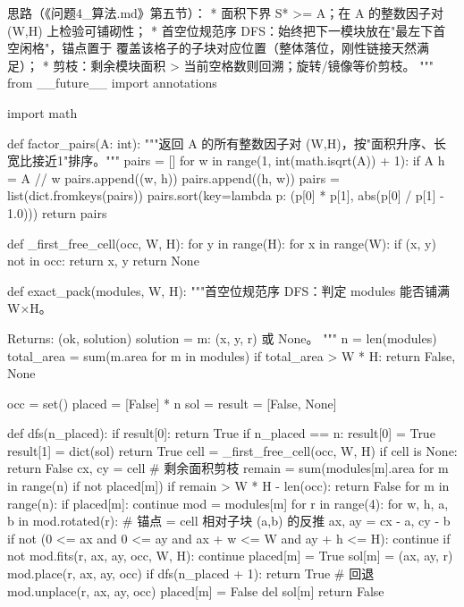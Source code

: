 \documentclass{JXUSTmodeling}
\begin{document}
\begin{appendixx}
\begin{python}
思路（《问题4_算法.md》第五节）：
  * 面积下界 S* >= A；在 A 的整数因子对 (W,H) 上检验可铺砌性；
  * 首空位规范序 DFS：始终把下一模块放在"最左下首空闲格"，锚点置于
    覆盖该格子的子块对应位置（整体落位，刚性链接天然满足）；
  * 剪枝：剩余模块面积 > 当前空格数则回溯；旋转/镜像等价剪枝。
"""
from __future__ import annotations

import math


def factor_pairs(A: int):
    """返回 A 的所有整数因子对 (W,H)，按"面积升序、长宽比接近1"排序。"""
    pairs = []
    for w in range(1, int(math.isqrt(A)) + 1):
        if A %
            h = A // w
            pairs.append((w, h))
            pairs.append((h, w))
    pairs = list(dict.fromkeys(pairs))
    pairs.sort(key=lambda p: (p[0] * p[1], abs(p[0] / p[1] - 1.0)))
    return pairs


def _first_free_cell(occ, W, H):
    for y in range(H):
        for x in range(W):
            if (x, y) not in occ:
                return x, y
    return None


def exact_pack(modules, W, H):
    """首空位规范序 DFS：判定 modules 能否铺满 W×H。

    Returns: (ok, solution)  solution = {m: (x, y, r)} 或 None。
    """
    n = len(modules)
    total_area = sum(m.area for m in modules)
    if total_area > W * H:
        return False, None

    occ = set()
    placed = [False] * n
    sol = {}
    result = [False, None]

    def dfs(n_placed):
        if result[0]:
            return True
        if n_placed == n:
            result[0] = True
            result[1] = dict(sol)
            return True
        cell = _first_free_cell(occ, W, H)
        if cell is None:
            return False
        cx, cy = cell
        # 剩余面积剪枝
        remain = sum(modules[m].area for m in range(n) if not placed[m])
        if remain > W * H - len(occ):
            return False
        for m in range(n):
            if placed[m]:
                continue
            mod = modules[m]
            for r in range(4):
                for w, h, a, b in mod.rotated(r):
                    # 锚点 = cell 相对子块 (a,b) 的反推
                    ax, ay = cx - a, cy - b
                    if not (0 <= ax and 0 <= ay and ax + w <= W and ay + h <= H):
                        continue
                    if not mod.fits(r, ax, ay, occ, W, H):
                        continue
                    placed[m] = True
                    sol[m] = (ax, ay, r)
                    mod.place(r, ax, ay, occ)
                    if dfs(n_placed + 1):
                        return True
                    # 回退
                    mod.unplace(r, ax, ay, occ)
                    placed[m] = False
                    del sol[m]
        return False


\end{python}
\end{appendixx}
\end{document}
